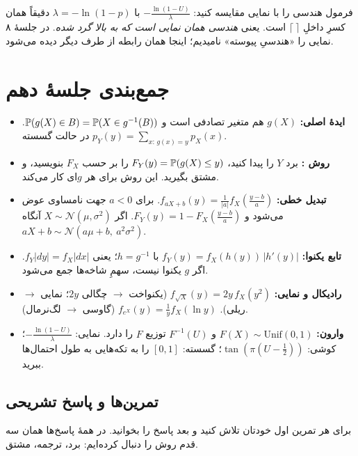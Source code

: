 فرمول هندسی را با نمایی مقایسه کنید: $-\frac{\ln(1-U)}{\lambda}$ با $\lambda=-\ln(1-p)$ دقیقاً همان کسرِ داخلِ $\lceil\ \rceil$ است. یعنی \emph{هندسی همان نمایی است که به بالا گرد شده}. در جلسهٔ ۸ نمایی را «هندسیِ پیوسته» نامیدیم؛ اینجا همان رابطه از طرف دیگر دیده می‌شود.

\section*{جمع‌بندی جلسهٔ دهم}

\begin{summary}
\begin{itemize}
  \item \textbf{ایدهٔ اصلی:} $g(X)$ هم متغیر تصادفی است و $\P(g(X)\in B)=\P(X\in g^{-1}(B))$. در حالت گسسته $p_Y(y)=\sum_{x:\,g(x)=y}p_X(x)$.
  \item \textbf{روش :} برد $Y$ را پیدا کنید، $F_Y(y)=\P(g(X)\le y)$ را بر حسب $F_X$ بنویسید، و مشتق بگیرید. این روش برای هر $g$ای کار می‌کند.
  \item \textbf{تبدیل خطی:} $f_{aX+b}(y)=\frac1{|a|}f_X(\frac{y-b}{a})$. برای $a<0$ جهت نامساوی عوض می‌شود و $F_Y(y)=1-F_X(\frac{y-b}{a})$. اگر $X\sim\mathcal N(\mu,\sigma^2)$ آنگاه $aX+b\sim\mathcal N(a\mu+b,\ a^2\sigma^2)$.
  \item \textbf{تابع یکنوا:} $f_Y(y)=f_X(h(y))\,|h'(y)|$ با $h=g^{-1}$؛ یعنی $f_Y|dy|=f_X|dx|$. اگر $g$ یکنوا نیست، سهمِ شاخه‌ها جمع می‌شود.
  \item \textbf{رادیکال و نمایی:} $f_{\sqrt X}(y)=2y\,f_X(y^2)$ (یکنواخت $\to$ چگالی $2y$؛ نمایی $\to$ ریلی). $f_{e^X}(y)=\frac1y f_X(\ln y)$ (گاوسی $\to$ لگ‌نرمال).
  \item \textbf{ وارون:} $F(X)\sim\mathrm{Unif}(0,1)$ و $F^{-1}(U)$ توزیع $F$ را دارد. نمایی: $-\frac{\ln(1-U)}{\lambda}$؛ کوشی: $\tan(\pi(U-\frac12))$؛ گسسته: $[0,1]$ را به تکه‌هایی به طول احتمال‌ها ببرید.
\end{itemize}
\end{summary}

\subsection*{تمرین‌ها و پاسخ تشریحی}

برای هر تمرین اول خودتان تلاش کنید و بعد پاسخ را بخوانید. در همهٔ پاسخ‌ها همان سه قدم روش  را دنبال کرده‌ایم: برد، ترجمه، مشتق.

